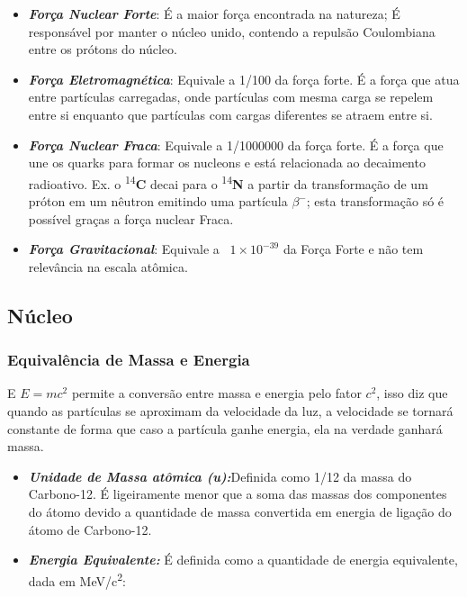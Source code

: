 \documentclass[11pt,a4paper]{article}
\begin{document}
                \begin{itemize}
                    \item \textbf{\textit{\textcolor{CarnationPink}{Força Nuclear Forte}}}: É a maior força encontrada na natureza; É responsável por manter o núcleo unido, contendo a repulsão Coulombiana entre os prótons do núcleo.
                    \item \textbf{\textit{\textcolor{CarnationPink}{Força Eletromagnética}}}: Equivale a 1/100 da força forte. É a força que atua entre partículas carregadas, onde partículas com mesma carga se repelem entre si enquanto que partículas com cargas diferentes se atraem entre si.
                    \item \textbf{\textit{\textcolor{CarnationPink}{Força Nuclear Fraca}}}: Equivale a 1/1000000 da força forte. É a força que une os quarks para formar os nucleons e está relacionada ao decaimento radioativo. Ex. o \textsuperscript{14}\textbf{C} decai para o  \textsuperscript{14}\textbf{N} a partir da transformação de um próton em um nêutron emitindo uma partícula $\beta ^-$; esta transformação só é possível graças a força nuclear Fraca.
                    \item \textbf{\textit{\textcolor{CarnationPink}{Força Gravitacional}}}: Equivale a ~$1 \times 10^{-39}$ da Força Forte e não tem relevância na escala atômica.
                \end{itemize}

        \subsection{Núcleo}
            \subsubsection{Equivalência de Massa e Energia}

                E   $E = m c^2$ permite a conversão entre massa e energia pelo fator $c^2$, isso diz que quando as partículas se aproximam da velocidade da luz, a velocidade se tornará constante de forma que caso a partícula ganhe energia, ela na verdade ganhará massa.


                \begin{itemize}
                    \item \textbf{\textit{\textcolor{CarnationPink}{Unidade de Massa atômica (u):}}}Definida como 1/12 da massa do Carbono-12. É ligeiramente menor que a soma das massas dos componentes do átomo devido a quantidade de massa convertida em energia de ligação do átomo de Carbono-12.  
                    \item \textbf{\textit{\textcolor{CarnationPink}{Energia Equivalente:}}} É definida como a quantidade de energia equivalente, dada em \unit{MeV/c^2}:

                \end{itemize}
\end{document}

